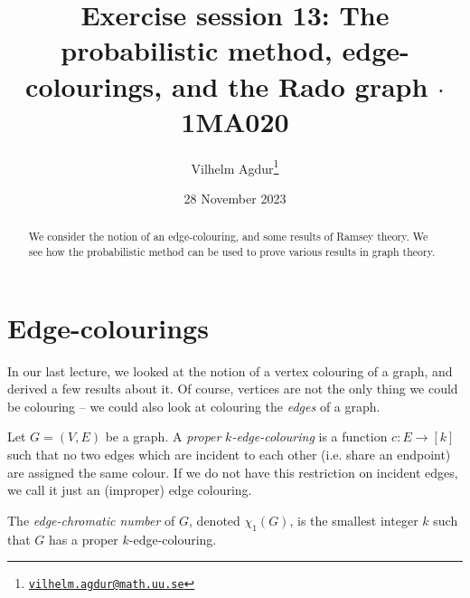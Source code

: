 \documentclass[nobib]{tufte-handout}
\title{Exercise session 13: The probabilistic method, edge-colourings, and the Rado graph $\cdot$ 1MA020}
\author[Vilhelm Agdur]{Vilhelm Agdur\thanks{\href{mailto:vilhelm.agdur@math.uu.se}{\nolinkurl{vilhelm.agdur@math.uu.se}}}}
\date{28 November 2023}
\begin{document}
\maketitle%

\begin{abstract}
\noindent
We consider the notion of an edge-colouring, and some results of Ramsey theory. We see how the probabilistic method can be used to prove various results in graph theory.
\end{abstract}

\section{Edge-colourings}

In our last lecture, we looked at the notion of a vertex colouring of a graph, and derived a few results about it. Of course, vertices are not the only thing we could be colouring -- we could also look at colouring the \emph{edges} of a graph.

\begin{definition}
    Let $G = (V,E)$ be a graph. A \emph{proper} \emph{$k$-edge-colouring} is a function $c: E \to [k]$ such that no two edges which are incident to each other (i.e. share an endpoint) are assigned the same colour. If we do not have this restriction on incident edges, we call it just an (improper) edge colouring.

    The \emph{edge-chromatic number} of $G$, denoted $\chi_1(G)$, is the smallest integer $k$ such that $G$ has a proper $k$-edge-colouring.
\end{definition}
\end{document}
